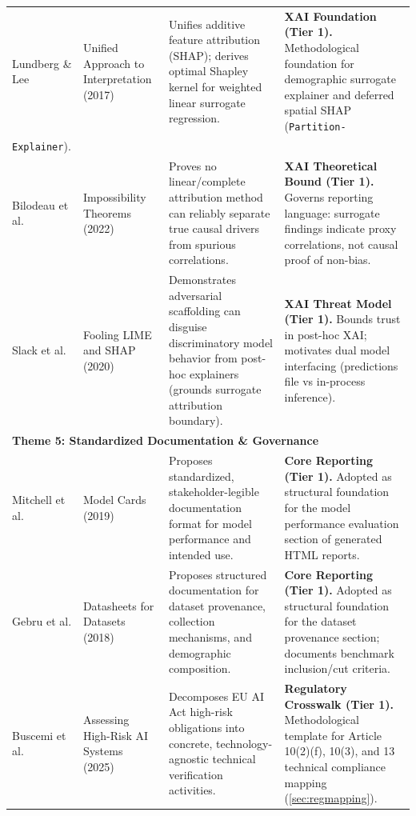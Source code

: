 \begin{center}
\begin{longtable}{|p{2.2cm}|p{2.6cm}|p{4.4cm}|p{4.4cm}|}
Lundberg \& Lee \cite{lundberg2017unified} &
Unified Approach to Interpretation (2017) &
Unifies additive feature attribution (SHAP); derives optimal Shapley kernel for weighted linear surrogate regression. &
\textbf{XAI Foundation (Tier 1).} Methodological foundation for demographic surrogate explainer and deferred spatial SHAP (\texttt{Partition-}\\ \texttt{Explainer}). \\
\hline

Bilodeau et al. \cite{bilodeau2022impossibility} &
Impossibility Theorems (2022) &
Proves no linear/complete attribution method can reliably separate true causal drivers from spurious correlations. &
\textbf{XAI Theoretical Bound (Tier 1).} Governs reporting language: surrogate findings indicate proxy correlations, not causal proof of non-bias. \\
\hline

Slack et al. \cite{slack2020fooling} &
Fooling LIME and SHAP (2020) &
Demonstrates adversarial scaffolding can disguise discriminatory model behavior from post-hoc explainers (grounds surrogate attribution boundary). &
\textbf{XAI Threat Model (Tier 1).} Bounds trust in post-hoc XAI; motivates dual model interfacing (predictions file vs in-process inference). \\
\hline

\multicolumn{4}{|l|}{\textbf{Theme 5: Standardized Documentation \& Governance}} \\
\hline
Mitchell et al. \cite{mitchell2019modelcards} &
Model Cards (2019) &
Proposes standardized, stakeholder-legible documentation format for model performance and intended use. &
\textbf{Core Reporting (Tier 1).} Adopted as structural foundation for the model performance evaluation section of generated HTML reports. \\
\hline

Gebru et al. \cite{gebru2018datasheets} &
Datasheets for Datasets (2018) &
Proposes structured documentation for dataset provenance, collection mechanisms, and demographic composition. &
\textbf{Core Reporting (Tier 1).} Adopted as structural foundation for the dataset provenance section; documents benchmark inclusion/cut criteria. \\
\hline

Buscemi et al. \cite{buscemi2025assessing} &
Assessing High-Risk AI Systems (2025) &
Decomposes EU AI Act high-risk obligations into concrete, technology-agnostic technical verification activities. &
\textbf{Regulatory Crosswalk (Tier 1).} Methodological template for Article 10(2)(f), 10(3), and 13 technical compliance mapping (\cref{sec:regmapping}). \\
\hline


\end{longtable}
\end{center}
